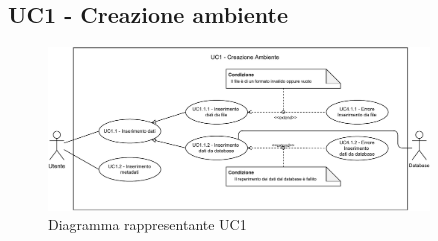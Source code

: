 \newpage
\subsection{UC1 - Creazione ambiente}
\label{sub:uc1}


\begin{figure}[h]
    \centering
    \includegraphics[width=0.9\textwidth]{componenti/casi-duso/diagrammi/UC1.pdf}
    \caption{Diagramma rappresentante UC1}
    \label{fig:UC1}
\end{figure}


